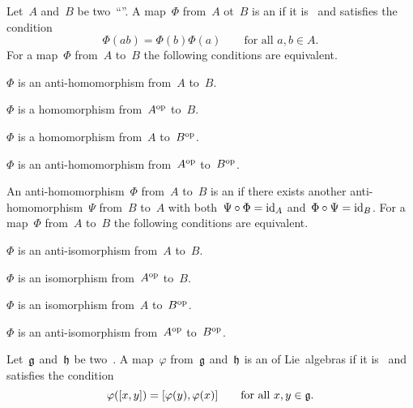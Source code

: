 % 


\begin{recall}
  Let~$A$ and~$B$ be two~\enquote{\algebras{$\kf$}}.
  A map~$\Phi$ from~$A$ ot~$B$ is an  if it is~{\linear{$\kf$}} and satisfies the condition
  \[
    \Phi(ab)
    =
    \Phi(b) \Phi(a)
    \qquad
    \text{for all~$a, b \in A$.}
  \]
  For a map~$\Phi$ from~$A$ to~$B$ the following conditions are equivalent.
  \begin{equivalenceslist*}
    \item
      $\Phi$ is an anti-homomorphism from~$A$ to~$B$.
    \item
      $\Phi$ is a homomorphism from~$A^{\mathrm{op}}$ to~$B$.
    \item
      $\Phi$ is a homomorphism from~$A$ to~$B^{\mathrm{op}}$.
    \item
      $\Phi$ is an anti-homomorphism from~$A^{\mathrm{op}}$ to~$B^{\mathrm{op}}$.
  \end{equivalenceslist*}

  An anti-homomorphism~$\Phi$ from~$A$ to~$B$ is an  if there exists another anti-homomorphism~$\Psi$ from~$B$ to~$A$ with both~$\Psi \circ \Phi = \mathrm{id}_A$ and~$\Phi \circ \Psi = \mathrm{id}_B$.
  For a map~$\Phi$ from~$A$ to~$B$ the following conditions are equivalent.
  \begin{equivalenceslist*}
    \item
      $\Phi$ is an anti-isomorphism from~$A$ to~$B$.
    \item
      $\Phi$ is an isomorphism from~$A^{\mathrm{op}}$ to~$B$.
    \item
      $\Phi$ is an isomorphism from~$A$ to~$B^{\mathrm{op}}$.
    \item
      $\Phi$ is an anti-isomorphism from~$A^{\mathrm{op}}$ to~$B^{\mathrm{op}}$.
  \end{equivalenceslist*}
\end{recall}


\begin{definition}
  Let~$\mathfrak{g}$ and~$\mathfrak{h}$ be two~\liealgebras{$\kf$}.
  A map~$\varphi$ from~$\mathfrak{g}$ and~$\mathfrak{h}$ is an  of Lie~algebras if it is~{\linear{$\kf$}} and satisfies the condition
  \[
    \varphi([x,y]) = [\varphi(y), \varphi(x)]
    \qquad
    \text{for all~$x, y \in \mathfrak{g}$.}
  \]
\end{definition}


